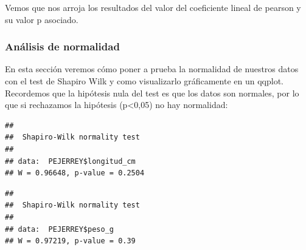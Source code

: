 \documentclass[
]{article}
\newenvironment{Shaded}{\begin{snugshade}}{\end{snugshade}}
\newcommand{\AttributeTok}[1]{\textcolor[rgb]{0.13,0.29,0.53}{#1}}
\newcommand{\CommentTok}[1]{\textcolor[rgb]{0.56,0.35,0.01}{\textit{#1}}}
\newcommand{\DecValTok}[1]{\textcolor[rgb]{0.00,0.00,0.81}{#1}}
\newcommand{\FunctionTok}[1]{\textcolor[rgb]{0.13,0.29,0.53}{\textbf{#1}}}
\newcommand{\NormalTok}[1]{#1}
\newcommand{\SpecialCharTok}[1]{\textcolor[rgb]{0.81,0.36,0.00}{\textbf{#1}}}
\newcommand{\StringTok}[1]{\textcolor[rgb]{0.31,0.60,0.02}{#1}}
\begin{document}
Vemos que nos arroja los resultados del valor del coeficiente lineal de
pearson y su valor p asociado.

\subsubsection{Análisis de normalidad}\label{anuxe1lisis-de-normalidad}

En esta sección veremos cómo poner a prueba la normalidad de nuestros
datos con el test de Shapiro Wilk y como visualizarlo gráficamente en un
qqplot. Recordemos que la hipótesis nula del test es que los datos son
normales, por lo que si rechazamos la hipótesis (p\textless0,05) no hay
normalidad:

\begin{Shaded}
\end{Shaded}

\begin{verbatim}
## 
##  Shapiro-Wilk normality test
## 
## data:  PEJERREY$longitud_cm
## W = 0.96648, p-value = 0.2504
\end{verbatim}

\begin{Shaded}
\end{Shaded}

\begin{verbatim}
## 
##  Shapiro-Wilk normality test
## 
## data:  PEJERREY$peso_g
## W = 0.97219, p-value = 0.39
\end{verbatim}

\begin{Shaded}
\end{Shaded}
\end{document}
